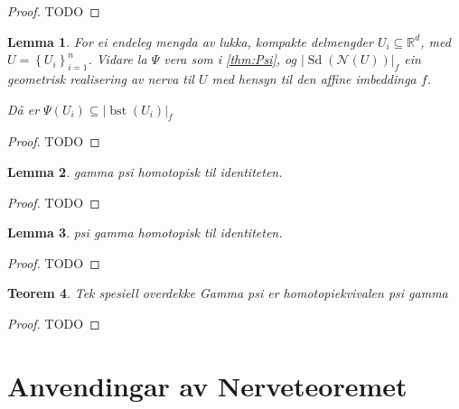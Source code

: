 \documentclass[a4paper, titlepage, 12pt, norsk]{article}
\theoremstyle{plain}
\newtheorem{theorem}{Teorem}[section]
\newtheorem{lemma}[theorem]{Lemma}
\theoremstyle{definition}
\newcommand{\Rb}{\mathbb{R}}
\newcommand{\Nc}{\mathcal{N}}
\newcommand{\gr}[1]{ \lvert #1 \rvert } %
\newcommand{\set}[1]{ \left \{ #1 \right \} } %
\DeclareMathOperator{\Sd}{Sd}
\DeclareMathOperator{\bst}{bst}
\begin{document}
\begin{proof}
	TODO
\end{proof}

\begin{lemma} %
	For ei endeleg mengda av lukka, kompakte delmengder \( U_i \subseteq \Rb^d \), med \( U = \set{U_i}_{i=1}^n \). Vidare la \( \Psi \) vera som i \autoref{thm:Psi}, og \( \gr{\Sd(\Nc(U))}_f \) ein geometrisk realisering av nerva til \( U \) med hensyn til den affine imbeddinga \( f \). 

	Då er \( \Psi(U_i) \subseteq \gr{\bst(U_i)}_f \)
\end{lemma}

\begin{proof}
	TODO
\end{proof}

\begin{lemma}
	gamma psi homotopisk til identiteten.
\end{lemma}

\begin{proof}
	TODO
\end{proof}

\begin{lemma} %
	psi gamma homotopisk til identiteten.
\end{lemma}

\begin{proof}
	TODO
\end{proof}

\begin{theorem} %
	Tek spesiell overdekke
	Gamma psi er homotopiekvivalen
	psi gamma
\end{theorem}

\begin{proof}
	TODO
\end{proof}

\section{Anvendingar av Nerveteoremet}
\end{document}
